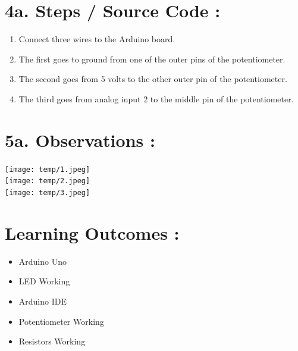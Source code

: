\documentclass[14pt]{extarticle}
\begin{document}


\newpage
\section*{\normalsize 4a. Steps / Source Code :}

\begin{enumerate}
  \item Connect three wires to the Arduino board. 
  \item The first goes to ground from one of the outer pins of the potentiometer. 
  \item The second goes from 5 volts to the other outer pin of the potentiometer. 
  \item The third goes from analog input 2 to the middle pin of the potentiometer.
\end{enumerate}

 

\section*{\normalsize 5a. Observations :}

\begin{center}
\texttt{[image: temp/1.jpeg]}\\

\texttt{[image: temp/2.jpeg]}\\

\texttt{[image: temp/3.jpeg]}
\end{center}

\newpage

\section*{\normalsize Learning Outcomes :}
  
  \begin{itemize}
    \item Arduino Uno
    \item LED Working
    \item Arduino IDE
    \item Potentiometer Working
    \item Resistors Working
  \end{itemize}
\end{document}
